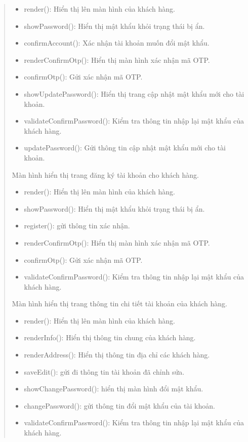 \begin{quote}
\begin{itemize}
		\item render(): Hiển thị lên màn hình của khách hàng.
		\item showPassword(): Hiển thị mật khẩu khỏi trạng thái bị ẩn.
		\item confirmAccount(): Xác nhận tài khoản muốn đổi mật khẩu.
		\item renderConfirmOtp(): Hiển thị màn hình xác nhận mã OTP.
		\item confirmOtp(): Gửi xác nhận mã OTP.
		\item showUpdatePassword(): Hiển thị trang cập nhật mật khẩu mới cho tài khoản.
		\item validateConfirmPassword(): Kiểm tra thông tin nhập lại mật khẩu của khách hàng.
		\item updatePassword(): Gửi thông tin cập nhật mật khẩu mới cho tài khoản.
	\end{itemize}
	Màn hình hiển thị trang đăng ký tài khoản cho khách hàng.
	\begin{itemize}
		\item render(): Hiển thị lên màn hình của khách hàng.
		\item showPassword(): Hiển thị mật khẩu khỏi trạng thái bị ẩn.
		\item register(): gửi thông tin xác nhận.
		\item renderConfirmOtp(): Hiển thị màn hình xác nhận mã OTP.
		\item confirmOtp(): Gửi xác nhận mã OTP.
		\item validateConfirmPassword(): Kiểm tra thông tin nhập lại mật khẩu của khách hàng.
	\end{itemize}
	Màn hình hiển thị trang thông tin chi tiết tài khoản của khách hàng.
	\begin{itemize}
		\item render(): Hiển thị lên màn hình của khách hàng.
		\item renderInfo(): Hiển thị thông tin chung của khách hàng.
		\item renderAddress(): Hiển thị thông tin địa chỉ các khách hàng.
		\item saveEdit(): gửi đi thông tin tài khoản đã chỉnh sửa.
		\item showChangePassword(): hiển thị màn hình đổi mật khẩu.
		\item changePassword(): gửi thông tin đổi mật khẩu của tài khoản.
		\item validateConfirmPassword(): Kiểm tra thông tin nhập lại mật khẩu của khách hàng.
	\end{itemize}

\end{quote}

